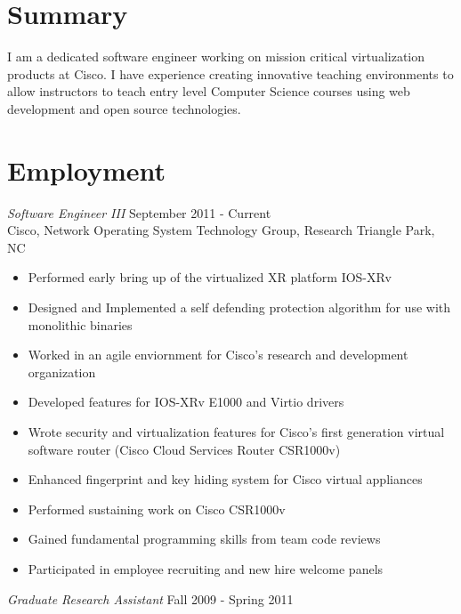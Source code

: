 \documentclass[line,margin]{res}
\begin{document}
\address{500 North Duke Street Durham, NC 27701}
\address{Email: vtwoods@gmail.com --- Cell: (703)475-1337}

 
\begin{resume}

\section{Summary} I am a dedicated software engineer working on mission critical virtualization products at Cisco.  I have experience creating innovative teaching environments to allow instructors to teach entry level Computer Science courses using web development and open source technologies.

\section{Employment}
        {\sl Software Engineer III} \hfill September 2011 - Current \\
        Cisco, Network Operating System Technology Group, Research Triangle Park, NC
        \begin{itemize}  \itemsep -2pt %
             \item Performed early bring up of the virtualized XR platform IOS-XRv
             \item Designed and Implemented a self defending protection algorithm for use with monolithic binaries
             \item Worked in an agile enviornment for Cisco's research and development organization
             \item Developed features for IOS-XRv E1000 and Virtio drivers
             \item Wrote security and virtualization features for Cisco's first generation virtual software router (Cisco Cloud Services Router CSR1000v)  
             \item Enhanced fingerprint and key hiding system for Cisco virtual appliances
             \item Performed sustaining work on Cisco CSR1000v
             \item Gained fundamental programming skills from team code reviews
             \item Participated in employee recruiting and new hire welcome panels
        \end{itemize}
        {\sl Graduate Research Assistant} \hfill  Fall 2009 - Spring 2011 \\

\end{resume}
\end{document}
